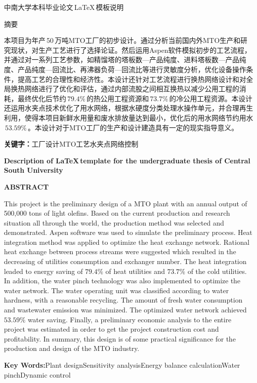 \vspace*{-21.6pt}
\begin{center}
\heiti
中南大学本科毕业论文\,\LaTeX\,模板说明
\end{center}
\par
\begin{center}
\heiti
{}
{}
摘要
\end{center}

\par
本项目为年产\,50\,万吨MTO工厂的初步设计。通过分析当前国内外MTO生产和研究现状，对生产工艺进行了选择论证。然后运用Aspen软件模拟初步的工艺流程，并通过对一系列工艺参数，如精馏塔的塔板数—产品纯度、进料塔板数—产品纯度、产品纯度—回流比、再沸器负荷—回流比等进行灵敏度分析，优化设备操作条件，提高工艺的合理性和经济性。本设计还针对工艺流程进行换热网络设计和对全局换热网络进行了优化和评估，通过内部流股之间相互换热以减少公用工程的消耗，最终优化后节约$\,79.4\%\,$的热公用工程资源和$\,73.7\%\,$的冷公用工程资源。本设计还运用水夹点技术优化了用水网络，根据水硬度分类处理水操作单元，并合理再生利用，使得本项目新鲜水用量和废水排放量达到最小，优化后的用水网络节约用水$\,53.59\%\,$。本设计对于MTO工厂的生产和设计建造具有一定的现实指导意义。

\bigskip
\noindent\textbf{关键字：}工厂\quad 设计\quad MTO\quad 工艺\quad 水夹点\quad  网络\quad  控制

\newpage
\vspace*{-21.6pt}
\begin{center}
\bfseries
\rmfamily Description of \LaTeX\,template for the undergraduate thesis of Central South University
\end{center}
\par
{}
{}
\begin{center}
\rmfamily\bfseries
ABSTRACT
\end{center}

\par
This project is the preliminary design of a MTO plant with an annual output of 500,000 tons of light olefins. Based on the current production and research situation all through the world, the production method was selected and demonstrated. Aspen software was used to simulate the preliminary process. Heat integration method was applied to optimize the heat exchange network. Rational heat exchange between process streams were suggested which resulted in the decreasing of utilities consumption and exchanger number. The heat integration leaded to energy saving of $79.4\%$ of heat utilities and $73.7\%$ of the cold utilities. In addition, the water pinch technology was also implemented to optimize the water network. The water operating unit was classified according to water hardness, with a reasonable recycling. The amount of fresh water consumption and wastewater emission was minimized. The optimized water network achieved $53.59\%$ water saving. Finally, a preliminary economic analysis to the entire project was estimated in order to get the project construction cost and profitability. In summary, this design is of some practical significance for the production and design of the MTO industry.

\bigskip
\noindent\textbf{Key Words:}\quad Plant design\quad Sensitivity analysis\quad Energy balance calculation\quad Water pinch\quad Dynamic control
